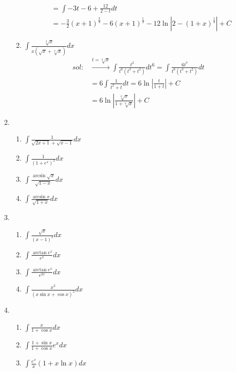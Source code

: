 \begin{enumerate}[{例}1.]
\begin{enumerate}[(1)]
\begin{align*}
                            &=\int -3t-6+\frac{12}{2-t}dt\\
                            &=-\frac{3}{2}(x+1)^{\frac{2}{3}}-6(x+1)^{\frac{1}{3}}-12\ln\left|2-(1+x)^{\frac{1}{3}}\right|+C
                    \end{align*}
                \item $\int \frac{\sqrt[3]{x}}{x(\sqrt{x}+\sqrt[3]{x})}dx$
                    \begin{align*}
                        sol:&\xrightarrow{t=\sqrt[6]{x}}\int\frac{t^2}{t^6(t^3+t^2)}dt^6=\int\frac{6t^7}{t^6(t^3+t^2)}dt\\
                            &=6\int\frac{1}{t^2+t}dt=6\ln\left|\frac{t}{1+t}\right|+C\\
                            &=6\ln\left|\frac{\sqrt[6]{x}}{1+\sqrt[6]{x}}\right|+C
                    \end{align*}
            \end{enumerate}
    \item   \begin{enumerate}[(1)]
                \item $\int \frac{1}{\sqrt{2x+1}+\sqrt{x-1}}dx$
                \item $\int \frac{1}{(1+e^x)^2}dx$
                \item $\int \frac{\arcsin \sqrt{x}}{\sqrt{1-x}}dx$
                \item $\int \frac{\arcsin x}{\sqrt{1+x}}dx$
            \end{enumerate}
    \item   \begin{enumerate}[(1)]
                \item $\int \frac{\sqrt{x}}{(x-1)^2}dx$
                \item $\int \frac{\arctan e^x}{e^x}dx$
                \item $\int \frac{\arctan e^x}{e^{2x}}dx$
                \item $\int \frac{x^2}{(x\sin x+ \cos x)^2}dx$
            \end{enumerate}
    \item   \begin{enumerate}[(1)]
                \item $\int \frac{x}{1+\cos x}dx$
                \item $\int \frac{1+\sin x}{1+\cos x}e^xdx$
                \item $\int \frac{e^x}{x}(1+x\ln x)dx$

\end{enumerate}
\end{enumerate}
